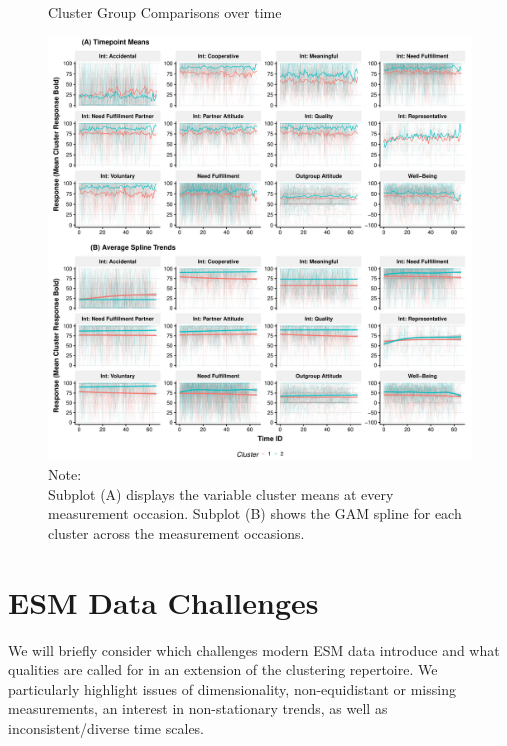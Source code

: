 \documentclass[man, 12pt, a4paper, mask]{apa7}
\theoremstyle{break}
\theoremstyle{plain}
\begin{document}
\begin{figure}[hbtp]
  \caption{Cluster Group Comparisons over time}
  \label{fig:clusterTs}
  \centering\includegraphics[width=\textwidth]{figures/clusterTsComb.pdf}
  \caption*{Note: \\
  Subplot (A) displays the variable cluster means at every measurement occasion. Subplot (B) shows the GAM spline for each cluster across the measurement occasions.}
\end{figure}

\printbibliography

\appendix

\section{ESM Data Challenges}
\label{app:ChallengesAppendix}
We will briefly consider which challenges modern ESM data introduce and what qualities are called for in an extension of the clustering repertoire. We particularly highlight issues of dimensionality, non-equidistant or missing measurements, an interest in non-stationary trends, as well as inconsistent/diverse time scales. 
\end{document}
